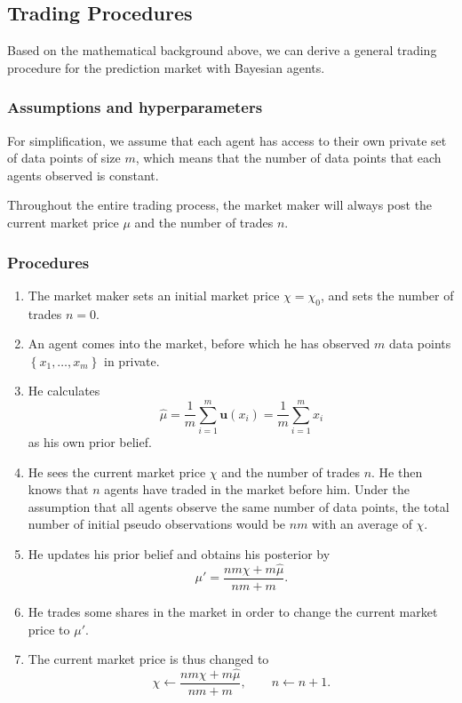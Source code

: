 \documentclass[12pt]{article}
\begin{document}
\subsection{Trading Procedures}\label{trading-procedure}
Based on the mathematical background above, we can derive a general trading procedure for the prediction market with Bayesian agents.
\subsubsection{Assumptions and hyperparameters} 
For simplification, we assume that each agent has access to their own private set of data points of size $m$, which means that the number of data points that each agents observed is constant.

Throughout the entire trading process, the market maker will always post the current market price $\mu$ and the number of trades $n$.
\subsubsection{Procedures}
\begin{enumerate}
    \item The market maker sets an initial market price $\chi=\chi_0$, and sets the number of trades $n=0$.
    \item An agent comes into the market, before which he has observed $m$ data points $\left\{ x_1,\ldots,x_m\right\}$ in private.
    \item He calculates 
    \[\hat{\mu}=\frac{1}{m}\sum_{i=1}^m \mathbf{u}(x_i)=\frac{1}{m}\sum_{i=1}^m x_i\]
    as his own prior belief.
    \item He sees the current market price $\chi$ and the number of trades $n$. He then knows that $n$ agents have traded in the market before him. Under the assumption that all agents observe the same number of data points, the total number of initial pseudo observations would be $nm$ with an average of $\chi$.
    \item He updates his prior belief and obtains his posterior by 
    \[\mu'=\frac{nm\chi+m\hat{\mu}}{nm+m}.\]
    \item He trades some shares in the market in order to change the current market price to $\mu'$.
    \item The current market price is thus changed to 
    \[\chi\leftarrow\frac{nm\chi+m\hat{\mu}}{nm+m},\qquad n\leftarrow n+1.\]
\end{enumerate}
\end{document}

